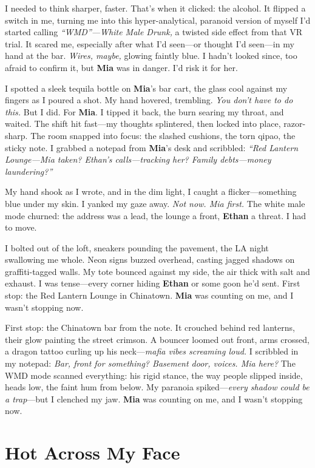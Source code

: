 \documentclass{article}
\begin{document}
I needed to think sharper, faster. That’s when it clicked: the alcohol. It flipped a switch in me, turning me into this hyper-analytical, paranoid version of myself I’d started calling \textit{“WMD”—White Male Drunk,} a twisted side effect from that VR trial. It scared me, especially after what I’d seen—or thought I’d seen—in my hand at the bar. \textit{Wires, maybe,} glowing faintly blue. I hadn’t looked since, too afraid to confirm it, but \textbf{Mia} was in danger. I’d risk it for her.

I spotted a sleek tequila bottle on \textbf{Mia}’s bar cart, the glass cool against my fingers as I poured a shot. My hand hovered, trembling. \textit{You don’t have to do this.} But I did. For \textbf{Mia}. I tipped it back, the burn searing my throat, and waited. The shift hit fast—my thoughts splintered, then locked into place, razor-sharp. The room snapped into focus: the slashed cushions, the torn qipao, the sticky note. I grabbed a notepad from \textbf{Mia}’s desk and scribbled: \textit{“Red Lantern Lounge—Mia taken? Ethan’s calls—tracking her? Family debts—money laundering?”}

My hand shook as I wrote, and in the dim light, I caught a flicker—something blue under my skin. I yanked my gaze away. \textit{Not now. Mia first.} The white male mode churned: the address was a lead, the lounge a front, \textbf{Ethan} a threat. I had to move.

I bolted out of the loft, sneakers pounding the pavement, the LA night swallowing me whole. Neon signs buzzed overhead, casting jagged shadows on graffiti-tagged walls. My tote bounced against my side, the air thick with salt and exhaust. I was tense—every corner hiding \textbf{Ethan} or some goon he’d sent. First stop: the Red Lantern Lounge in Chinatown. \textbf{Mia} was counting on me, and I wasn’t stopping now.

First stop: the Chinatown bar from the note. It crouched behind red lanterns, their glow painting the street crimson. A bouncer loomed out front, arms crossed, a dragon tattoo curling up his neck—\textit{mafia vibes screaming loud.} I scribbled in my notepad: \textit{Bar, front for something? Basement door, voices. Mia here?} The WMD mode scanned everything: his rigid stance, the way people slipped inside, heads low, the faint hum from below. My paranoia spiked—\textit{every shadow could be a trap}—but I clenched my jaw. \textbf{Mia} was counting on me, and I wasn’t stopping now.

\section*{Hot Across My Face}
\end{document}
